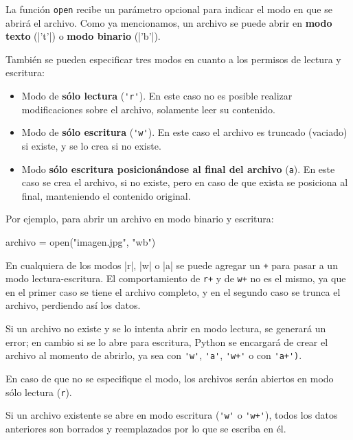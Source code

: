 La función \lstinline!open! recibe un parámetro opcional para indicar el
modo en que se abrirá el archivo. Como ya mencionamos, un archivo se puede abrir en \textbf{modo texto} (|'t'|) o \textbf{modo binario} (|'b'|).

También se pueden especificar tres modos en cuanto a los permisos de lectura y escritura:

\begin{itemize}
\item Modo de \textbf{sólo lectura} (\lstinline!'r'!).   En este caso no es
posible realizar modificaciones sobre el archivo, solamente leer su
contenido.

\item Modo de \textbf{sólo escritura} (\lstinline!'w'!). En este caso el
archivo es truncado (vaciado) si existe, y se lo crea si no existe.

\item Modo \textbf{sólo escritura posicionándose al final del archivo}
(\lstinline!a!). En este caso se crea el archivo, si no existe, pero en
caso de que exista se posiciona al final, manteniendo el contenido
original.
\end{itemize}

Por ejemplo, para abrir un archivo en modo binario y escritura:

\begin{codigo-python-sn}
archivo = open("imagen.jpg", "wb")
\end{codigo-python-sn}

En cualquiera de los modos |r|, |w| o |a| se puede agregar un
\lstinline!+! para pasar a un modo lectura-escritura. El comportamiento de
\lstinline!r+! y de \lstinline!w+! no es el mismo, ya que en el primer caso
se tiene el archivo completo, y en el segundo caso se trunca el archivo,
perdiendo así los datos.

\begin{observacion}
Si un archivo no existe y se lo intenta abrir en modo lectura, se generará
un error; en cambio si se lo abre para escritura, Python se encargará de
crear el archivo al momento de abrirlo, ya sea con \lstinline!'w'!,
\lstinline!'a'!, \lstinline!'w+'! o con \lstinline!'a+')!.
\end{observacion}

En caso de que no se especifique el modo, los archivos serán abiertos en
modo sólo lectura (\lstinline!r!).

\begin{atencion}
Si un archivo existente se abre en modo escritura (\lstinline!'w'! o
\lstinline!'w+'!), todos los datos anteriores son borrados y reemplazados
por lo que se escriba en él.
\end{atencion}

